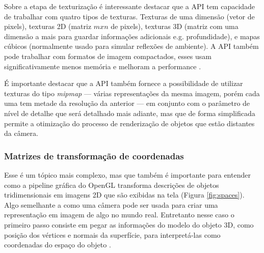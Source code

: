 Sobre a etapa de texturização é interessante destacar que a API tem capacidade de trabalhar com quatro tipos de texturas. Texturas de uma dimensão (vetor de pixels), texturas 2D (matriz $ mxn $ de pixels), texturas 3D (matriz com uma dimensão a mais para guardar informações adicionais e.g. profundidade), e mapas cúbicos (normalmente usado para simular reflexões de ambiente). A API também pode trabalhar com formatos de imagem compactados, esses usam significativamente menos memória e melhoram a performance \cite{GLSLBook}.

É importante destacar que a API também fornece a possibilidade de utilizar texturas do tipo \textit{mipmap} --- várias representações da mesma imagem, porém cada uma tem metade da resolução da anterior --- em conjunto com o parâmetro de nível de detalhe que será detalhado mais adiante, mas que de forma simplificada permite a otimização do processo de renderização de objetos que estão distantes da câmera. 

\subsubsection{Matrizes de transformação de coordenadas}
\label{sec:matrizes-transformacao-coordenadas}

\begin{figure}[htp]
	\centering
\end{figure}
\nocite{spaces}

Esse é um tópico mais complexo, mas que também é importante para entender como a pipeline gráfica do OpenGL transforma descrições de objetos tridimensionais em imagens 2D que são exibidas na tela (Figura \ref{fig:spaces}). Algo semelhante a como uma câmera pode ser usada para criar uma representação em imagem de algo no mundo real. Entretanto nesse caso o primeiro passo consiste em pegar as informações do modelo do objeto 3D, como posição dos vértices e normais da superfície, para interpretá-las como coordenadas do espaço do objeto \cite{GLSLBook}. 


